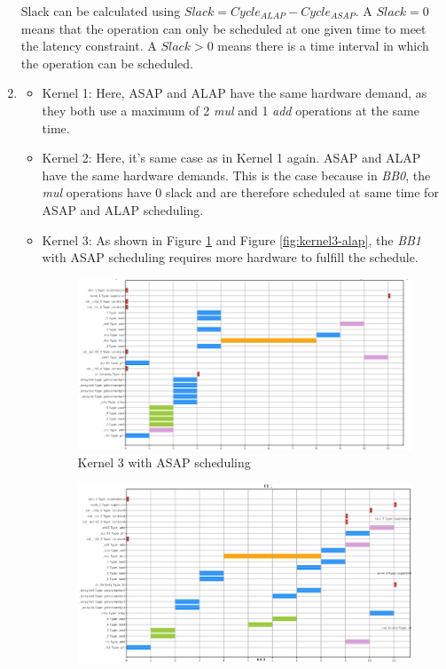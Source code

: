 \documentclass{article}
\begin{document}
\begin{enumerate}
        Slack can be calculated using $Slack = Cycle_{ALAP} - Cycle_{ASAP}$. A $Slack = 0$ means that the operation can only be scheduled at one given time to meet the latency constraint. A $Slack > 0$ means there is a time interval in which the operation can be scheduled.
        \item
        \begin{itemize}
            \item Kernel 1: Here, ASAP and ALAP have the same hardware demand, as they both use a maximum of 2 \emph{mul} and 1 \emph{add} operations at the same time.
            \item Kernel 2: Here, it's same case as in Kernel 1 again. ASAP and ALAP have the same hardware demands. This is the case because in \emph{BB0}, the \emph{mul} operations have 0 slack and are therefore scheduled at same time for ASAP and ALAP scheduling.
            \item Kernel 3: As shown in Figure \ref{fig:kernel3-asap} and Figure \ref{fig:kernel3-alap}, the \emph{BB1} with ASAP scheduling requires more hardware to fulfill the schedule.
            \begin{figure}[H]
                    \centering
                    \includegraphics[width=.9\textwidth]{figures/kernel3_asap.png}
                    \caption{Kernel 3 with ASAP scheduling}
                    \label{fig:kernel3-asap}
            \end{figure}
            \begin{figure}[H]
            \centering
                \includegraphics[width=.9\textwidth]{figures/kernel3_alap.png}

\end{figure}
\end{itemize}
\end{enumerate}
\end{document}
